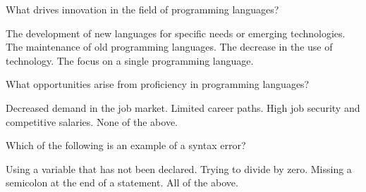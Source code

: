 \documentclass[12pt, addpoints, answers]{exam}
\newif\ifprintanswers
\newcommand{\fillin}[1]{%
  \ifprintanswers
    \textbf{#1}%
  \else
    \underline{\hspace{2mm}}%
  \fi
}
\begin{document}
\begin{questions}
	\question What drives innovation in the field of programming languages?
	\begin{choices}
		\CorrectChoice The development of new languages for specific needs or emerging technologies.
		\choice The maintenance of old programming languages.
		\choice The decrease in the use of technology.
		\choice The focus on a single programming language.
	\end{choices}
				
	\question What opportunities arise from proficiency in programming languages?
	\begin{choices}
		\choice Decreased demand in the job market.
		\choice Limited career paths.
		\CorrectChoice High job security and competitive salaries.
		\choice None of the above.
	\end{choices}
				
	
				
				
				
	\newpage 
	\question Which of the following is an example of a syntax error?
	\begin{choices}
		\choice Using a variable that has not been declared.
		\choice Trying to divide by zero.
		\CorrectChoice Missing a semicolon at the end of a statement.
		\choice All of the above.
	\end{choices}
				

\end{questions}
\end{document}
